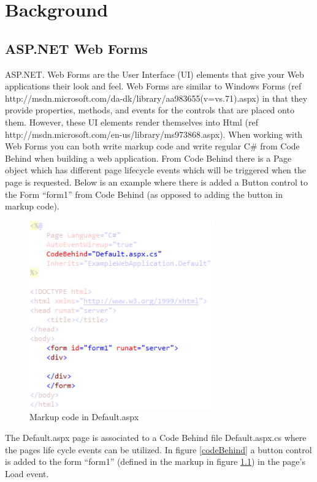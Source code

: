 \chapter{Background}

\section{ASP.NET Web Forms} %
\label{sec:asp_net_web_forms}
	ASP.NET. Web Forms are the User Interface (UI) elements that give your Web applications their look and feel. Web Forms are similar to Windows Forms (ref http://msdn.microsoft.com/da-dk/library/aa983655(v=vs.71).aspx) in that they provide properties, methods, and events for the controls that are placed onto them. However, these UI elements render themselves into Html (ref http://msdn.microsoft.com/en-us/library/ms973868.aspx). When working with Web Forms you can both write markup code and write regular C\# from Code Behind when building a web application. From Code Behind there is a Page object which has different page lifecycle events which will be triggered when the page is requested. Below is an example where there is added a Button control to the Form “form1” from Code Behind (as opposed to adding the button in markup code).

	\begin{figure}
					\includegraphics[width=8cm]{resources/images/Markup.png}
				\caption{Markup code in Default.aspx}
				\label{markup}
			\end{figure}

	The Default.aspx page is associated to a Code Behind file Default.aspx.cs where the pages life cycle events can be utilized. In figure \ref{codeBehind} a button control is added to the form “form1” (defined in the markup in figure \ref{markup}) in the page’s Load event.

